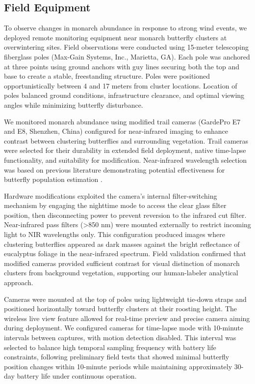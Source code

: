 \subsection{Field Equipment}

To observe changes in monarch abundance in response to strong wind events, we deployed remote monitoring equipment near monarch butterfly clusters at overwintering sites. Field observations were conducted using 15-meter telescoping fiberglass poles (Max-Gain Systems, Inc., Marietta, GA). Each pole was anchored at three points using ground anchors with guy lines securing both the top and base to create a stable, freestanding structure. Poles were positioned opportunistically between 4 and 17 meters from cluster locations. Location of poles balanced ground conditions, infrastructure clearance, and optimal viewing angles while minimizing butterfly disturbance.

We monitored monarch abundance using modified trail cameras (GardePro E7 and E8, Shenzhen, China) configured for near-infrared imaging to enhance contrast between clustering butterflies and surrounding vegetation. Trail cameras were selected for their durability in extended field deployment, native time-lapse functionality, and suitability for modification. Near-infrared wavelength selection was based on previous literature demonstrating potential effectiveness for butterfly population estimation \autocite{hristov_estimating_2019}. 

Hardware modifications exploited the camera's internal filter-switching mechanism by engaging the nighttime mode to access the clear glass filter position, then disconnecting power to prevent reversion to the infrared cut filter. Near-infrared pass filters (>850 nm) were mounted externally to restrict incoming light to NIR wavelengths only. This configuration produced images where clustering butterflies appeared as dark masses against the bright reflectance of eucalyptus foliage in the near-infrared spectrum. Field validation confirmed that modified cameras provided sufficient contrast for visual distinction of monarch clusters from background vegetation, supporting our human-labeler analytical approach.

Cameras were mounted at the top of poles using lightweight tie-down straps and positioned horizontally toward butterfly clusters at their roosting height. The wireless live view feature allowed for real-time preview and precise camera aiming during deployment. We configured cameras for time-lapse mode with 10-minute intervals between captures, with motion detection disabled. This interval was selected to balance high temporal sampling frequency with battery life constraints, following preliminary field tests that showed minimal butterfly position changes within 10-minute periods while maintaining approximately 30-day battery life under continuous operation.

